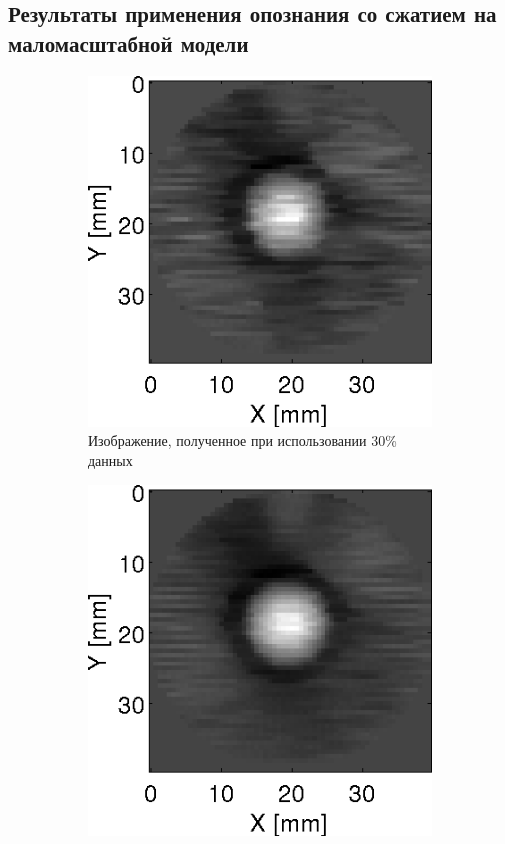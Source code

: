 \documentclass[14pt]{matmex-diploma}
\begin{document}
\subsection{Результаты применения опознания со сжатием на маломасштабной модели}
\begin{figure}[h]

\begin{subfigure}{.32\textwidth}
    \centering
    \includegraphics[width=1\linewidth]{pics/ref_kwave_30p.png}
    \caption{Изображение, полученное при использовании 30\% данных}
    \label{fig:percents_30}
\end{subfigure}
\begin{subfigure}{.32\textwidth}
    \centering
    \includegraphics[width=1\linewidth]{pics/ref_kwave_70p.png}

\end{subfigure}
\end{figure}
\end{document}
